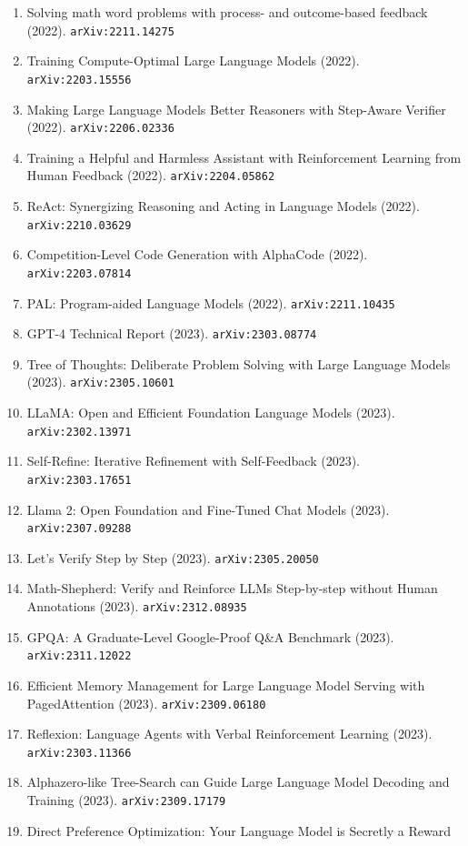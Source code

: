 \documentclass[11pt]{article}
\begin{document}
\begin{enumerate}
  Models (2022). \texttt{arXiv:2205.10625}
  \item Solving math word problems with process- and outcome-based feedback (2022). \texttt{arXiv:2211.14275}
  \item Training Compute-Optimal Large Language Models (2022). \texttt{arXiv:2203.15556}
  \item Making Large Language Models Better Reasoners with Step-Aware Verifier (2022). \texttt{arXiv:2206.02336}
  \item Training a Helpful and Harmless Assistant with Reinforcement Learning
  from Human Feedback (2022). \texttt{arXiv:2204.05862}
  \item ReAct: Synergizing Reasoning and Acting in Language Models (2022). \texttt{arXiv:2210.03629}
  \item Competition-Level Code Generation with AlphaCode (2022). \texttt{arXiv:2203.07814}
  \item PAL: Program-aided Language Models (2022). \texttt{arXiv:2211.10435}
  \item GPT-4 Technical Report (2023). \texttt{arXiv:2303.08774}
  \item Tree of Thoughts: Deliberate Problem Solving with Large Language Models (2023). \texttt{arXiv:2305.10601}
  \item LLaMA: Open and Efficient Foundation Language Models (2023). \texttt{arXiv:2302.13971}
  \item Self-Refine: Iterative Refinement with Self-Feedback (2023). \texttt{arXiv:2303.17651}
  \item Llama 2: Open Foundation and Fine-Tuned Chat Models (2023). \texttt{arXiv:2307.09288}
  \item Let's Verify Step by Step (2023). \texttt{arXiv:2305.20050}
  \item Math-Shepherd: Verify and Reinforce LLMs Step-by-step without Human
  Annotations (2023). \texttt{arXiv:2312.08935}
  \item GPQA: A Graduate-Level Google-Proof Q\&A Benchmark (2023). \texttt{arXiv:2311.12022}
  \item Efficient Memory Management for Large Language Model Serving with
  PagedAttention (2023). \texttt{arXiv:2309.06180}
  \item Reflexion: Language Agents with Verbal Reinforcement Learning (2023). \texttt{arXiv:2303.11366}
  \item Alphazero-like Tree-Search can Guide Large Language Model Decoding and
  Training (2023). \texttt{arXiv:2309.17179}
  \item Direct Preference Optimization: Your Language Model is Secretly a Reward

\end{enumerate}
\end{document}
